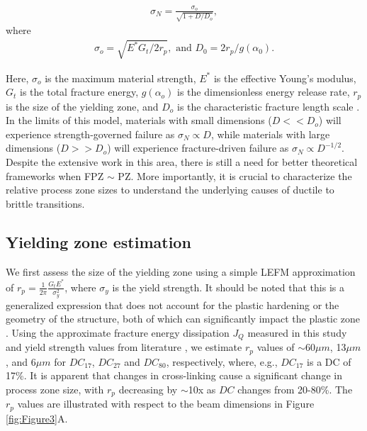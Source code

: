 \documentclass[11pt]{article}
\providecommand{\um}[0]{$\mu m$}
\providecommand{\rp}[0]{$r_p$}
\providecommand{\DC}[0]{$DC$}
\providecommand{\DCi}[0]{$DC_{17}$}
\providecommand{\DCj}[0]{$DC_{27}$}
\providecommand{\DCk}[0]{$DC_{80}$}
\providecommand{\Gt}[0]{$G_{t}$}
\providecommand{\Jq}[0]{$J_{Q}$}
\begin{document}
        \begin{align}
            \sigma_{N} = \frac{\sigma_{o}}{\sqrt{1+D/D_{o}}},  \label{Eq:SEL}
        \end{align}
        where
        \begin{align}
            \sigma_{o} = \sqrt{E^*G_{t}/2r_p}, \text{ and }  D_{0} = 2r_p/g(\alpha_{0}). \label{Eq:SEL2}
        \end{align}
        
        Here, $\sigma_{o}$ is the maximum material strength, $E^*$ is the effective Young's modulus, \Gt{} is the total fracture energy,  $g(\alpha_o)$ is the dimensionless energy release rate, \rp{} is the size of the yielding zone, and $D_{o}$ is the characteristic fracture length scale \cite{guinea1998stress, nguyen2021structural}.
        In the limits of this model, materials with small dimensions ($D << D_o$) will experience strength-governed failure as $\sigma_{N} \propto D$, while materials with large dimensions ($D >> D_o$) will experience fracture-driven failure as $\sigma_N \propto D^{-1/2}$.
        Despite the extensive work in this area, there is still a need for better theoretical frameworks when FPZ $\sim$ PZ.
        More importantly, it is crucial to characterize the relative process zone sizes to understand the underlying causes of ductile to brittle transitions.
        
        \subsection{Yielding zone estimation}
        We first assess the size of the yielding zone using a simple LEFM approximation of $r_p = \frac{1}{2\pi}\frac{G_{t}E^*}{\sigma_y^2}$, where $\sigma_y$ is the yield strength.
        It should be noted that this is a generalized expression that does not account for the plastic hardening or the geometry of the structure, both of which can significantly impact the plastic zone \cite{kudari2007effect}.
        Using the approximate fracture energy dissipation \Jq{} measured in this study and yield strength values from literature \cite{bauer2019programmable, bauer2020thermal}, we estimate \rp{} values of $\sim$60\um{}, 13\um{}, and 6\um{} for \DCi{}, \DCj{} and \DCk{}, respectively, where, e.g., \DCi{} is a DC of 17\%.
        It is apparent that changes in cross-linking cause a significant change in process zone size, with \rp{} decreasing by $\sim$10x as \DC{} changes from 20-80\%.
        The \rp{} values are illustrated with respect to the beam dimensions in Figure \ref{fig:Figure3}A.
\end{document}
